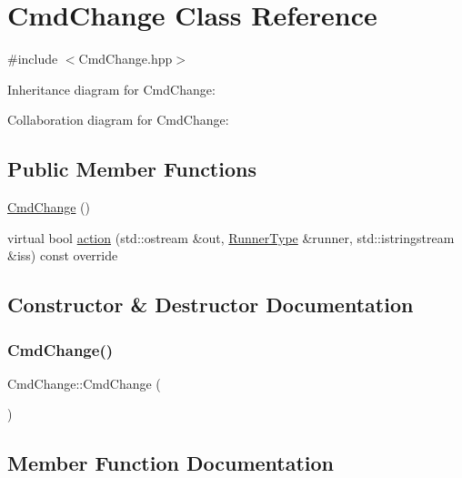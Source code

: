 \hypertarget{classCmdChange}{}\section{Cmd\+Change Class Reference}
\label{classCmdChange}


{\ttfamily \#include $<$Cmd\+Change.\+hpp$>$}



Inheritance diagram for Cmd\+Change\+:


Collaboration diagram for Cmd\+Change\+:
\subsection*{Public Member Functions}
\begin{DoxyCompactItemize}
\item 
\hyperlink{classCmdChange_a4fc728f5bac93453ad24311561bee975}{Cmd\+Change} ()
\item 
virtual bool \hyperlink{classCmdChange_a4c3bdb844bb270715716e21e20bb9c7f}{action} (std\+::ostream \&out, \hyperlink{Command_8hpp_ad45c3de597c2023a8be0399d914161f4}{Runner\+Type} \&runner, std\+::istringstream \&iss) const override
\end{DoxyCompactItemize}


\subsection{Constructor \& Destructor Documentation}
\mbox{\label{classCmdChange_a4fc728f5bac93453ad24311561bee975}} 
\subsubsection{\texorpdfstring{Cmd\+Change()}{CmdChange()}}
{\footnotesize\ttfamily Cmd\+Change\+::\+Cmd\+Change (\begin{DoxyParamCaption}{ }\end{DoxyParamCaption})}



\subsection{Member Function Documentation}
\mbox{\label{classCmdChange_a4c3bdb844bb270715716e21e20bb9c7f}} 
